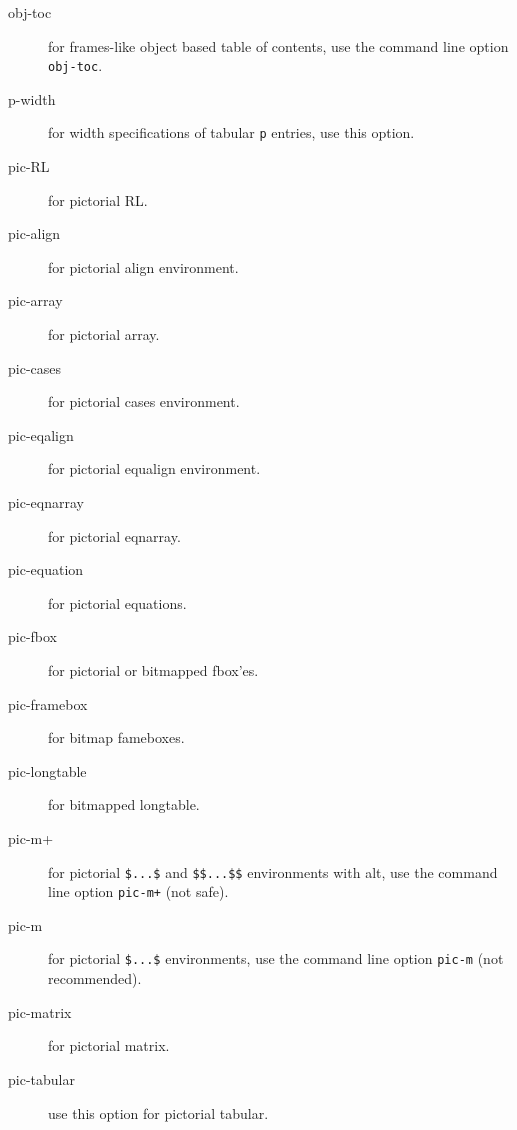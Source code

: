 \begin{description}
\item[obj-toc] for frames-like object based table of contents, use the
  command line option \verb=obj-toc=.


\item[p-width] for width specifications of tabular \verb=p= entries,
  use this option.

\item[pic-RL] for pictorial RL.

\item[pic-align] for pictorial align environment.

\item[pic-array] for pictorial array.

\item[pic-cases] for pictorial cases environment.

\item[pic-eqalign] for pictorial equalign environment.

\item[pic-eqnarray] for pictorial eqnarray.

\item[pic-equation] for pictorial equations.

\item[pic-fbox] for pictorial or bitmapped fbox'es.

\item[pic-framebox] for bitmap fameboxes.

\item[pic-longtable] for bitmapped longtable.

\item[pic-m+] for pictorial \verb=$...$= and \verb=$$...$$=
  environments with \latex alt, use the command line option
  \verb=pic-m+= (not safe).

\item[pic-m] for pictorial \verb=$...$= environments, use the command
  line option \verb=pic-m= (not recommended).

\item[pic-matrix] for pictorial matrix.




\item[pic-tabular] use this option for pictorial tabular.


\end{description}
